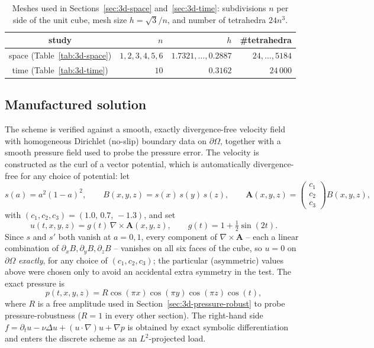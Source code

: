 \documentclass[11pt]{article}
\begin{document}
\begin{table}[h]\centering
\caption{Meshes used in Sections~\ref{sec:3d-space} and~\ref{sec:3d-time}: subdivisions
$n$ per side of the unit cube, mesh size $h=\sqrt3/n$, and number of tetrahedra $24n^3$.}
\label{tab:3d-mesh}
\begin{tabular}{crrr}
\toprule
study & $n$ & $h$ & \#tetrahedra \\
\midrule
space (Table~\ref{tab:3d-space}) & $1,2,3,4,5,6$ & $1.7321,\dots,0.2887$ & $24,\dots,5184$ \\
time (Table~\ref{tab:3d-time})   & $10$          & $0.3162$              & $24\,000$ \\
\bottomrule
\end{tabular}
\end{table}

\subsection{Manufactured solution}
\label{sec:3d-manufactured}

The scheme is verified against a smooth, exactly divergence-free velocity field with
homogeneous Dirichlet (no-slip) boundary data on $\partial\Omega$, together with a smooth
pressure field used to probe the pressure error. The velocity is constructed as the curl
of a vector potential, which is automatically divergence-free for any choice of potential:
let
\[
s(a)=a^2(1-a)^2,\qquad B(x,y,z)=s(x)\,s(y)\,s(z),\qquad
\mathbf A(x,y,z)=\begin{pmatrix}c_1\\ c_2\\ c_3\end{pmatrix}B(x,y,z),
\]
with $(c_1,c_2,c_3)=(1.0,\,0.7,\,-1.3)$, and set
\[
u(t,x,y,z)=g(t)\,\nabla\times\mathbf A(x,y,z),\qquad g(t)=1+\tfrac12\sin(2t).
\]
Since $s$ and $s'$ both vanish at $a=0,1$, every component of $\nabla\times\mathbf A$ --
each a linear combination of $\partial_xB,\partial_yB,\partial_zB$ -- vanishes on all six
faces of the cube, so $u=0$ on $\partial\Omega$ \emph{exactly}, for any choice of
$(c_1,c_2,c_3)$; the particular (asymmetric) values above were chosen only to avoid an
accidental extra symmetry in the test. The exact pressure is
\[
p(t,x,y,z)=R\cos(\pi x)\cos(\pi y)\cos(\pi z)\cos(t),
\]
where $R$ is a free amplitude used in Section~\ref{sec:3d-pressure-robust} to probe
pressure-robustness ($R=1$ in every other section). The right-hand side
$f=\partial_tu-\nu\Delta u+(u\cdot\nabla)u+\nabla p$ is obtained by exact symbolic
differentiation and enters the discrete scheme as an $L^2$-projected load.
\end{document}

